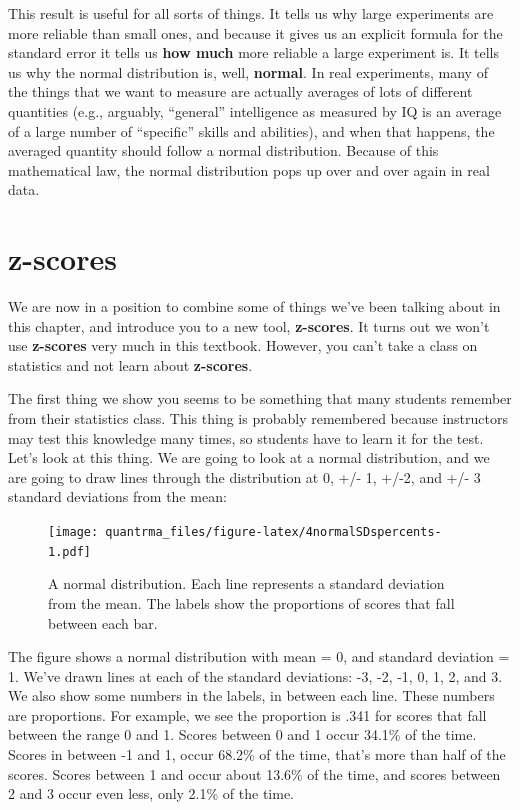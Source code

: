 \documentclass[
]{book}
\begin{document}
This result is useful for all sorts of things. It tells us why large experiments are more reliable than small ones, and because it gives us an explicit formula for the standard error it tells us \textbf{how much} more reliable a large experiment is. It tells us why the normal distribution is, well, \textbf{normal}. In real experiments, many of the things that we want to measure are actually averages of lots of different quantities (e.g., arguably, ``general'' intelligence as measured by IQ is an average of a large number of ``specific'' skills and abilities), and when that happens, the averaged quantity should follow a normal distribution. Because of this mathematical law, the normal distribution pops up over and over again in real data.

\hypertarget{z-scores}{%
\section{z-scores}\label{z-scores}}

We are now in a position to combine some of things we've been talking about in this chapter, and introduce you to a new tool, \textbf{z-scores}. It turns out we won't use \textbf{z-scores} very much in this textbook. However, you can't take a class on statistics and not learn about \textbf{z-scores}.

The first thing we show you seems to be something that many students remember from their statistics class. This thing is probably remembered because instructors may test this knowledge many times, so students have to learn it for the test. Let's look at this thing. We are going to look at a normal distribution, and we are going to draw lines through the distribution at 0, +/- 1, +/-2, and +/- 3 standard deviations from the mean:

\begin{figure}
\centering
\texttt{[image: quantrma\_files/figure-latex/4normalSDspercents-1.pdf]}
\caption{\label{fig:4normalSDspercents}A normal distribution. Each line represents a standard deviation from the mean. The labels show the proportions of scores that fall between each bar.}
\end{figure}

The figure shows a normal distribution with mean = 0, and standard deviation = 1. We've drawn lines at each of the standard deviations: -3, -2, -1, 0, 1, 2, and 3. We also show some numbers in the labels, in between each line. These numbers are proportions. For example, we see the proportion is .341 for scores that fall between the range 0 and 1. Scores between 0 and 1 occur 34.1\% of the time. Scores in between -1 and 1, occur 68.2\% of the time, that's more than half of the scores. Scores between 1 and occur about 13.6\% of the time, and scores between 2 and 3 occur even less, only 2.1\% of the time.
\end{document}
